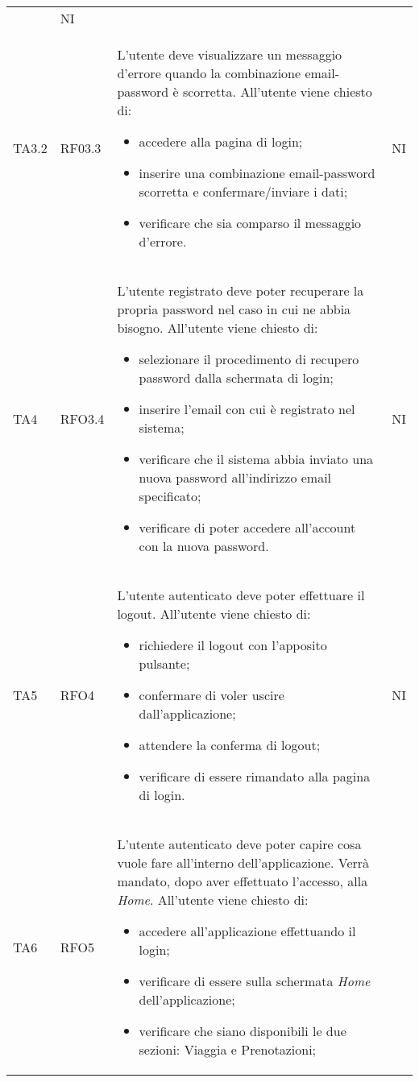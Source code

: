 \begin{longtable}{ >{\centering}p{} >{\centering}p{} >{\centering}p{}
			>{\centering}p{}}
\begin{itemize}
		 \end{itemize}  &	NI	\tabularnewline
		 TA3.2 & RF03.3 &	L'utente deve visualizzare un messaggio d'errore quando la combinazione email-password è scorretta. All'utente viene chiesto di:
		 \begin{itemize}
		 	\item accedere alla pagina di login;
		 	\item inserire una combinazione email-password scorretta e confermare/inviare i dati;
		 	\item verificare che sia comparso il messaggio d'errore.
		 \end{itemize}  &	NI	\tabularnewline
		 TA4 & RFO3.4	&	L'utente registrato deve poter recuperare la propria password nel caso in cui ne abbia bisogno. All'utente viene chiesto di:
		 \begin{itemize}
		 	\item selezionare il procedimento di recupero password dalla schermata di login;
		 	\item inserire l'email con cui è registrato nel sistema;
		 	\item verificare che il sistema abbia inviato una nuova password all'indirizzo email specificato;
		 	\item verificare di poter accedere all'account con la nuova password.
		 \end{itemize}	&	NI	\tabularnewline
		 TA5	& RFO4 &	L'utente autenticato deve poter effettuare il logout. All'utente viene chiesto di:
		 \begin{itemize}
		 	\item richiedere il logout con l'apposito pulsante;
		 	\item confermare di voler uscire dall'applicazione;
		 	\item attendere la conferma di logout;
		 	\item verificare di essere rimandato alla pagina di login.
		 \end{itemize}  &	NI	\tabularnewline
	 	 TA6	& RFO5 & L'utente autenticato deve poter capire cosa vuole fare all'interno dell'applicazione. Verrà mandato, dopo aver effettuato l'accesso, alla \textit{Home}. 
	 	 All'utente viene chiesto di:
	 	 \begin{itemize}
	 	 	\item accedere all'applicazione effettuando il login;
	 	 	\item verificare di essere sulla schermata \textit{Home} dell'applicazione;
	 	 	\item verificare che siano disponibili le due sezioni: Viaggia e Prenotazioni;

\end{itemize}
\end{longtable}
